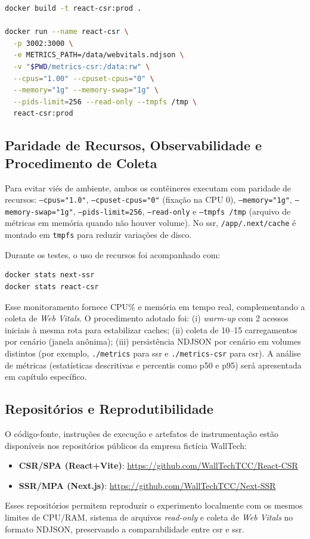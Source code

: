 \begin{lstlisting}[language=bash,caption={Build e execução do container CSR com limites e volume de métricas}]
docker build -t react-csr:prod .

docker run --name react-csr \
  -p 3002:3000 \
  -e METRICS_PATH=/data/webvitals.ndjson \
  -v "$PWD/metrics-csr:/data:rw" \
  --cpus="1.00" --cpuset-cpus="0" \
  --memory="1g" --memory-swap="1g" \
  --pids-limit=256 --read-only --tmpfs /tmp \
  react-csr:prod
\end{lstlisting}

\subsection{Paridade de Recursos, Observabilidade e Procedimento de Coleta}
\label{ssec:paridade-observabilidade}

Para evitar viés de ambiente, ambos os contêineres executam com paridade de recursos: \texttt{--cpus="1.0"}, \texttt{--cpuset-cpus="0"} (fixação na CPU 0), \texttt{--memory="1g"}, \texttt{--memory-swap="1g"}, \texttt{--pids-limit=256}, \texttt{--read-only} e \texttt{--tmpfs /tmp} (arquivo de métricas em memória quando não houver volume). No \acrshort{ssr}, \texttt{/app/.next/cache} é montado em \texttt{tmpfs} para reduzir variações de disco.

Durante os testes, o uso de recursos foi acompanhado com:
\begin{lstlisting}[language=bash]
docker stats next-ssr
docker stats react-csr
\end{lstlisting}
Esse monitoramento fornece CPU\% e memória em tempo real, complementando a coleta de \textit{Web Vitals}. O procedimento adotado foi:
(i) \textit{warm-up} com 2 acessos iniciais à mesma rota para estabilizar caches;
(ii) coleta de 10--15 carregamentos por cenário (janela anônima);
(iii) persistência NDJSON por cenário em volumes distintos (por exemplo, \texttt{./metrics} para \acrshort{ssr} e \texttt{./metrics-csr} para \acrshort{csr}).
A análise de métricas (estatísticas descritivas e percentis como p50 e p95) será apresentada em capítulo específico.

\subsection{Repositórios e Reprodutibilidade}
\label{ssec:repositorios-repro}
O código-fonte, instruções de execução e artefatos de instrumentação estão disponíveis nos repositórios públicos da empresa fictícia WallTech:
\begin{itemize}
  \item \textbf{CSR/SPA (React+Vite)}: \url{https://github.com/WallTechTCC/React-CSR}
  \item \textbf{SSR/MPA (Next.js)}: \url{https://github.com/WallTechTCC/Next-SSR}
\end{itemize}
Esses repositórios permitem reproduzir o experimento localmente com os mesmos limites de CPU/RAM, sistema de arquivos \textit{read-only} e coleta de \textit{Web Vitals} no formato NDJSON, preservando a comparabilidade entre \acrshort{csr} e \acrshort{ssr}.


